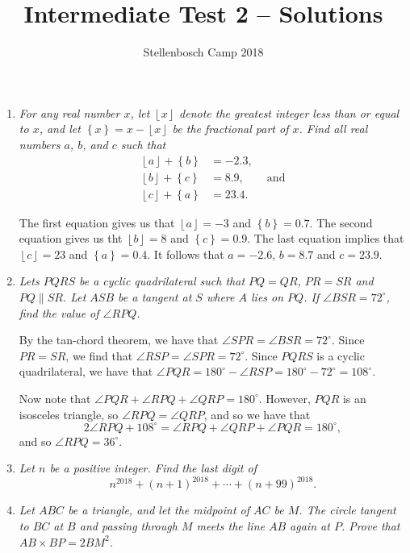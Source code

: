 \documentclass{article}
\title{Intermediate Test 2 -- Solutions}
\author{Stellenbosch Camp 2018}
\date{\vspace{-12pt}}
\newcommand{\floor}[1]{\ensuremath{\left\lfloor#1\right\rfloor}}
\newcommand{\fracpart}[1]{\ensuremath{\left\{#1\right\}}}
\begin{document}
\maketitle

\begin{enumerate}

\item %
\textit{For any real number $x$, let $\floor{x}$ denote the greatest integer less than or equal to $x$, and let $\fracpart{x} = x -\floor{x}$ be the fractional part of $x$. Find all real numbers $a$, $b$, and $c$ such that
\begin{align*}
  \floor{a} +\fracpart{b} &= -2.3, \\
  \floor{b} +\fracpart{c} &= 8.9, \qquad \mathrm{and}\\
  \floor{c} +\fracpart{a} &= 23.4.
\end{align*}}

The first equation gives us that $\floor{a} = -3$ and $\fracpart{b} = 0.7$. The second equation gives us tht $\floor{b} = 8$ and $\fracpart{c} = 0.9$. The last equation implies that $\floor{c} = 23$ and $\fracpart{a} = 0.4$. It follows that $a = -2.6$, $b = 8.7$ and $c = 23.9$.


\vspace{12pt}
\item %
\textit{Lets $PQRS$ be a cyclic quadrilateral such that $PQ = QR$, $PR = SR$ and $PQ \parallel SR$. Let $ASB$ be a tangent at $S$ where $A$ lies on $PQ$. If $\angle BSR = 72^{\circ}$, find the value of $\angle RPQ$.}

By the tan-chord theorem, we have that $\angle SPR = \angle BSR = 72^\circ$. Since $PR = SR$, we find that $\angle RSP = \angle SPR = 72^\circ$. Since $PQRS$ is a cyclic quadrilateral, we have that $\angle PQR = 180^\circ - \angle RSP = 180^\circ - 72^\circ = 108^\circ$.

Now note that $\angle PQR + \angle RPQ + \angle QRP = 180^\circ$. However, $PQR$ is an isosceles triangle, so $\angle RPQ = \angle QRP$, and so we have that
\[
	2\angle RPQ + 108^\circ = \angle RPQ + \angle QRP + \angle PQR = 180^\circ,
\]
and so $\angle RPQ = 36^\circ$.


\vspace{12pt}
\item %
\textit{Let $n$ be a positive integer. Find the last digit of \[ n^{2018} +(n+1)^{2018} +\dotsb +(n+99)^{2018}. \]}


\vspace{12pt}
\item %
\textit{Let $ABC$ be a triangle, and let the midpoint of $AC$ be $M$. The circle tangent to $BC$ at $B$ and passing through $M$ meets the line $AB$ again at $P$. Prove that $AB \times BP = 2 BM^2$.}


\end{enumerate}
\end{document}
